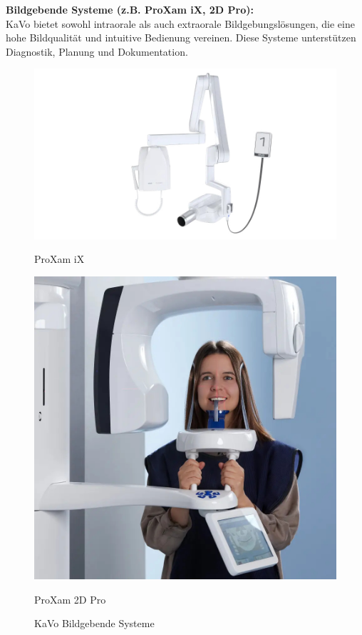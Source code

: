 \textbf{Bildgebende Systeme (z.B. ProXam iX, 2D Pro):} \\
KaVo bietet sowohl intraorale als auch extraorale Bildgebungslösungen, die eine hohe Bildqualität und intuitive Bedienung vereinen. Diese Systeme unterstützen Diagnostik, Planung und Dokumentation.

\begin{figure}[H]
  \centering
  \begin{minipage}[b]{0.45\textwidth}
    \centering
    \includegraphics[width=\textwidth]{images/ProXam iX & iS.jpg}
    \caption*{ProXam iX}
  \end{minipage}
  \hspace{0.05\textwidth}
  \begin{minipage}[b]{0.45\textwidth}
    \centering
    \includegraphics[width=\textwidth]{images/Extraoral-ProXam-2D_Patient-standing2_4000px.jpg}
    \caption*{ProXam 2D Pro}
  \end{minipage}
  \caption{KaVo Bildgebende Systeme}
  \label{fig:Bildgebende Systeme}
\end{figure}
\vspace{1em}

